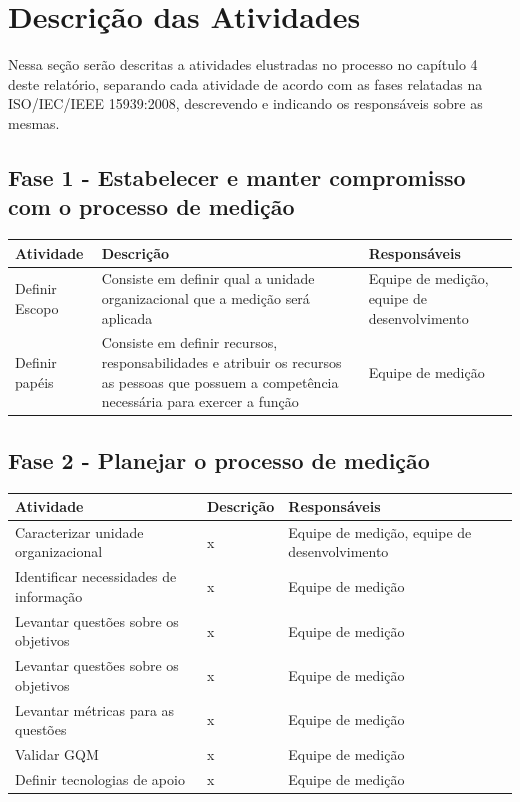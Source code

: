 \section{Descrição das Atividades}

Nessa seção serão descritas a atividades elustradas no processo no capítulo 4 deste relatório, separando cada atividade de acordo com as fases relatadas na ISO/IEC/IEEE 15939:2008, descrevendo e indicando os responsáveis sobre as mesmas.

\subsection{Fase 1 - Estabelecer e manter compromisso com o processo de medição}
	\begin{tabular}{ |p{4cm}|p{6cm}| p{3cm} |}
	 \hline
	 Atividade 		& 		Descrição & Responsáveis \\
	 \hline
	 	Definir Escopo & Consiste em definir qual a unidade organizacional que a medição será aplicada &  Equipe de medição, equipe de desenvolvimento \\
	 \hline
	 	Definir papéis & Consiste em definir recursos, responsabilidades e atribuir os recursos as pessoas que possuem a competência necessária para exercer a função & Equipe de medição \\
	 \hline
	\end{tabular}


\subsection{Fase 2 - Planejar o processo de medição}

	\begin{tabular}{ |p{4cm}|p{6cm}| p{3cm} |}
	 \hline
	 Atividade 		& 		Descrição & Responsáveis \\
	 \hline
	 	Caracterizar unidade organizacional & x &  Equipe de medição, equipe de desenvolvimento \\
	 \hline
	 	Identificar necessidades de informação & x &  Equipe de medição \\
	 \hline
	 	Levantar questões sobre os objetivos & x &  Equipe de medição \\
	 \hline
	 	Levantar questões sobre os objetivos & x &  Equipe de medição \\
	 \hline
	 Levantar métricas para as questões & x &  Equipe de medição \\
	 \hline
	 Validar GQM & x &  Equipe de medição \\
	 \hline
	 Definir tecnologias de apoio & x &  Equipe de medição \\
	 \hline
	\end{tabular}

